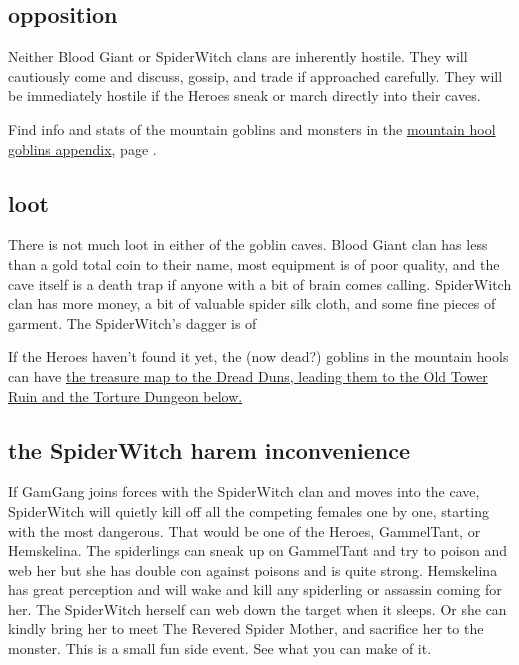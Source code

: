 \subsection*{opposition}

Neither Blood Giant or SpiderWitch clans are inherently hostile. They will cautiously come and discuss, gossip, and trade if approached carefully. They will be immediately hostile if the Heroes sneak or march directly into their caves.

Find info and stats of the mountain goblins and monsters in the \hyperref[appendixmountaingoblins]{mountain hool goblins appendix}, page \pageref{appendixmountaingoblins}.


\subsection*{loot}

There is not much loot in either of the goblin caves. Blood Giant clan has less than a gold total coin to their name, most equipment is of poor quality, and the cave itself is a death trap if anyone with a bit of brain comes calling. SpiderWitch clan has more money, a bit of valuable spider silk cloth, and some fine pieces of garment. The SpiderWitch's dagger is of 

If the Heroes haven't found it yet, the (now dead?) goblins in the mountain hools can have 
\hyperref[xxtorturedungeon]{the treasure map to the Dread Duns, leading them to the Old Tower Ruin and the Torture Dungeon below.} 


\subsection*{the SpiderWitch harem inconvenience}

If GamGang joins forces with the SpiderWitch clan and moves into the cave, SpiderWitch will quietly kill off all the competing females one by one, starting with the most dangerous. That would be one of the Heroes, GammelTant, or Hemskelina. The spiderlings can sneak up on GammelTant and try to poison and web her but she has double con against poisons and is quite strong. Hemskelina has great perception and will wake and kill any spiderling or assassin coming for her. The SpiderWitch herself can web down the target when it sleeps. Or she can kindly bring her to meet The Revered Spider Mother, and sacrifice her to the monster.
This is a small fun side event. See what you can make of it.

















